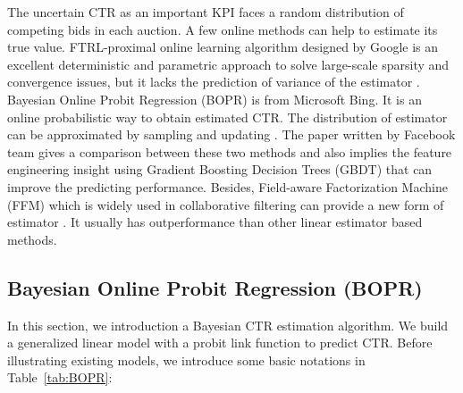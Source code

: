The uncertain CTR as an important KPI faces a random distribution of competing bids in each auction. A few online methods can help to estimate its true value. FTRL-proximal online learning algorithm designed by Google is an excellent deterministic and parametric approach to solve large-scale sparsity and convergence issues, but it lacks the prediction of variance of the estimator \cite{h.brendanmcmahangaryholt2013}. Bayesian Online Probit Regression (BOPR) is from Microsoft Bing. It is an online probabilistic way to obtain estimated CTR. The distribution of estimator can be approximated by sampling and updating \cite{thoregraepeljoaquinquinonerocandelathomasborchertralfherbrich2010}. The paper written by Facebook team \cite{xinranhejunfengpanetc2014} gives a comparison between these two methods and also implies the feature engineering insight using Gradient Boosting Decision Trees (GBDT) that can improve the predicting performance. Besides, Field-aware Factorization Machine (FFM) which is widely used in collaborative filtering can provide a new form of estimator \cite{michaeljahrerandreastscherjeongyoonleejingjingdeng2012, steffenrendle2010}. It usually has outperformance than other linear estimator based methods.

\subsection{Bayesian Online Probit Regression (BOPR)}
In this section, we introduction a Bayesian CTR estimation algorithm. We build a generalized linear model with a probit link function to predict CTR. Before illustrating existing models, we introduce some basic notations in Table~\ref{tab:BOPR}:


